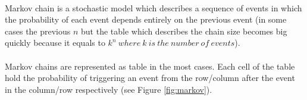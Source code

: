 \documentclass[]{article}
\begin{document}
        \paragraph{}Markov chain\cite{markov} is a stochastic model which describes a sequence of events in which the probability of each event depends entirely on the previous event (in some cases the previous $n$ but the table which describes the chain size becomes big quickly because it equals to $k^n\ where\ k\ is\ the\ number\ of\ events$).\paragraph{}
                Markov chains are represented as table in the most cases. Each cell of the table hold the probability of triggering an event from the row/column after the event in the column/row respectively (see Figure \ref{fig:markov}).
\end{document}

